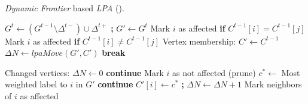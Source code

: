 \begin{algorithm}[hbtp]
\caption{\textit{Dynamic Frontier} based \textit{LPA} (\FroLPA{}).}
\label{alg:rak}
\begin{algorithmic}[1]
 \label{alg:rak--main-begin}
  \State $G^t \gets (G^{t-1} \setminus \Delta^{t-}) \cup \Delta^{t+}$ \textbf{;} $G' \gets G^t$
   \label{alg:rak--mark-begin}
    \State Mark $i$ as affected \textbf{if} $C^{t-1}[i] = C^{t-1}[j]$
  \EndFor
    \State Mark $i$ as affected \textbf{if} $C^{t-1}[i] \neq C^{t-1}[j]$
  \EndFor \label{alg:rak--mark-end}
  \State Vertex membership: $C' \gets C^{t-1}$ \label{alg:rak--membership}
  \ForAll{$l_i \in [0 .. \text{\small{MAX\_ITERATIONS}})$} \label{alg:rak--iterations-begin}
    \State $\Delta N \gets lpaMove(G', C')$ \label{alg:rak--propagate}
     \textbf{break}  \label{alg:rak--converged}
    \EndIf
  \EndFor \label{alg:rak--iterations-end}
\EndFunction \label{alg:rak--main-end}

\Statex

  \State Changed vertices: $\Delta N \gets 0$
     \textbf{continue} \label{alg:rak--affected}
    \EndIf
    \State Mark $i$ as not affected (prune) \label{alg:rak--prune}
    \State $c^* \gets$ Most weighted label to $i$ in $G'$ \label{alg:rak--best-community}
     \textbf{continue} \label{alg:rak--best-community-same}
    \EndIf
    \State $C'[i] \gets c^*$ \textbf{;} $\Delta N \gets \Delta N + 1$ \label{alg:rak--perform-move}
    \State Mark neighbors of $i$ as affected \label{alg:rak--remark}
  \EndFor
{}
\EndFunction
\end{algorithmic}
\end{algorithm}




